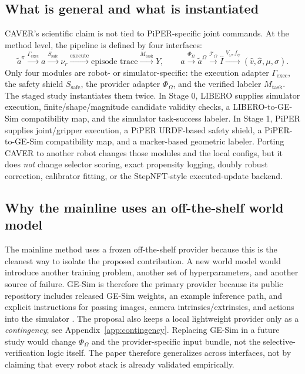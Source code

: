 \documentclass[10pt]{article}
\theoremstyle{plain}
\theoremstyle{definition}
\theoremstyle{remark}
\begin{document}
\subsection{What is general and what is instantiated}
CAVER's scientific claim is not tied to PiPER-specific joint commands. At the method level, the pipeline is defined by four interfaces:
\[
\tilde a^{\pi} \xrightarrow{\Gamma_{\mathrm{exec}}} a \xrightarrow{S_{\mathrm{safe}}} \nu_r \xrightarrow{\text{execute}} \text{episode trace} \xrightarrow{M_{\mathrm{task}}} Y,
\qquad
 a \xrightarrow{\Phi_{\Omega}} \tilde a^{\Omega} \xrightarrow{\mathcal T_{\Omega}} \hat I \xrightarrow{V_{\omega},f_{\psi}} (\hat v,\hat\sigma,\mu,\sigma).
\]
Only four modules are robot- or simulator-specific: the execution adapter $\Gamma_{\mathrm{exec}}$, the safety shield $S_{\mathrm{safe}}$, the provider adapter $\Phi_{\Omega}$, and the verified labeler $M_{\mathrm{task}}$. The staged study instantiates them twice. In Stage 0, LIBERO supplies simulator execution, finite/shape/magnitude candidate validity checks, a LIBERO-to-GE-Sim compatibility map, and the simulator task-success labeler. In Stage 1, PiPER supplies joint/gripper execution, a PiPER URDF-based safety shield, a PiPER-to-GE-Sim compatibility map, and a marker-based geometric labeler. Porting CAVER to another robot changes those modules and the local configs, but it does \emph{not} change selector scoring, exact propensity logging, doubly robust correction, calibrator fitting, or the StepNFT-style executed-update backend.

\subsection{Why the mainline uses an off-the-shelf world model}
The mainline method uses a frozen off-the-shelf provider because this is the cleanest way to isolate the proposed contribution. A new world model would introduce another training problem, another set of hyperparameters, and another source of failure. GE-Sim is therefore the primary provider because its public repository includes released GE-Sim weights, an example inference path, and explicit instructions for passing images, camera intrinsics/extrinsics, and actions into the simulator \citep{genierepo2026}. The proposal also keeps a local lightweight provider only as a \emph{contingency}; see Appendix~\ref{app:contingency}. Replacing GE-Sim in a future study would change $\Phi_{\Omega}$ and the provider-specific input bundle, not the selective-verification logic itself. The paper therefore generalizes across interfaces, not by claiming that every robot stack is already validated empirically.
\end{document}
